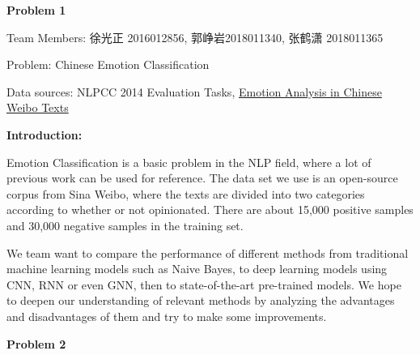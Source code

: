 \documentclass[UTF8,12pt]{article}
\newenvironment{problem}[2][Problem]
{ \begin{mdframed}[backgroundcolor=gray!20] \textbf{#1 #2}}
	{  \end{mdframed}}
\newenvironment{answer}
{%
}
{}
\begin{document}

\renewcommand{\qed}{\quad\qedsymbol}

\begin{problem}{1}
\end{problem}
\begin{answer}
	\noindent Team Members: 徐光正 2016012856, 郭峥岩2018011340, 张鹤潇 2018011365

	\noindent Problem: Chinese Emotion Classification

	\noindent Data sources: NLPCC 2014 Evaluation Tasks, \href{http://tcci.ccf.org.cn/conference/2014/dldoc/evtestdata1.zip}{Emotion Analysis in Chinese Weibo Texts} 
	
	\noindent\textbf{Introduction:}
	
	Emotion Classification is a basic problem in the NLP field, 
	where a lot of previous work can be used for reference.
	The data set we use is an open-source corpus from Sina Weibo, where the texts are divided into 
	two categories according to whether or not opinionated. There are about 15,000 positive samples 
	and 30,000 negative samples in the training set.
	
	We team want to compare the performance of different methods 
	from traditional machine learning models such as Naive Bayes, 
	to deep learning models using CNN, RNN or even GNN, then to state-of-the-art pre-trained models. 
	We hope to deepen our understanding of relevant methods by 
	analyzing the advantages and disadvantages of them and try to make some improvements.
	
\end{answer}
\begin{problem}{2}
\end{problem}
\end{document}
